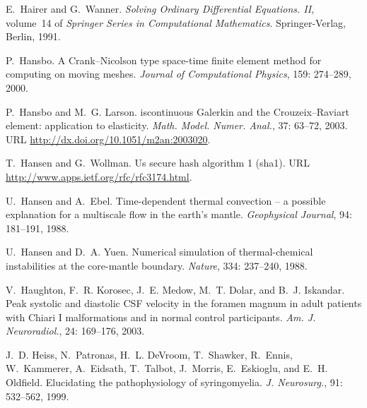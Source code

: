 \begin{thebibliography}{467}
E.~Hairer and G.~Wanner.
\newblock \emph{Solving Ordinary Differential Equations. {II}}, volume~14 of
  \emph{Springer Series in Computational Mathematics}.
\newblock Springer-Verlag, Berlin, 1991{}.

P.~Hansbo.
\newblock A {C}rank--{N}icolson type space-time finite element method for
  computing on moving meshes.
\newblock \emph{Journal of Computational Physics}, 159: 274--289,
  2000.

P.~Hansbo and M.~G. Larson.
iscontinuous {G}alerkin and the {C}rouzeix--{R}aviart element:
  application to elasticity.
\newblock \emph{Math. Model. Numer. Anal.}, 37: 63--72, 2003.
\newblock URL \url{http://dx.doi.org/10.1051/m2an:2003020}.

T.~Hansen and G.~Wollman.
\newblock Us secure hash algorithm 1 (sha1).
\newblock URL \url{http://www.apps.ietf.org/rfc/rfc3174.html}.

U.~Hansen and A.~Ebel.
\newblock Time-dependent thermal convection -- a possible explanation for a
  multiscale flow in the earth's mantle.
\newblock \emph{Geophysical Journal}, 94: 181--191, 1988.

U.~Hansen and D.~A. Yuen.
\newblock Numerical simulation of thermal-chemical instabilities at the
  core-mantle boundary.
\newblock \emph{Nature}, 334: 237--240, 1988.

V.~Haughton, F.~R. Korosec, J.~E. Medow, M.~T. Dolar, and B.~J. Iskandar.
\newblock Peak systolic and diastolic {CSF} velocity in the foramen magnum in
  adult patients with {C}hiari {I} malformations and in normal control
  participants.
\newblock \emph{Am. J. Neuroradiol.}, 24: 169--176, 2003.

J.~D. Heiss, N.~Patronas, H.~L. DeVroom, T.~Shawker, R.~Ennis, W.~Kammerer,
  A.~Eidsath, T.~Talbot, J.~Morris, E.~Eskioglu, and E.~H. Oldfield.
\newblock Elucidating the pathophysiology of syringomyelia.
\newblock \emph{J. Neurosurg.}, 91: 532--562, 1999.


\end{thebibliography}
